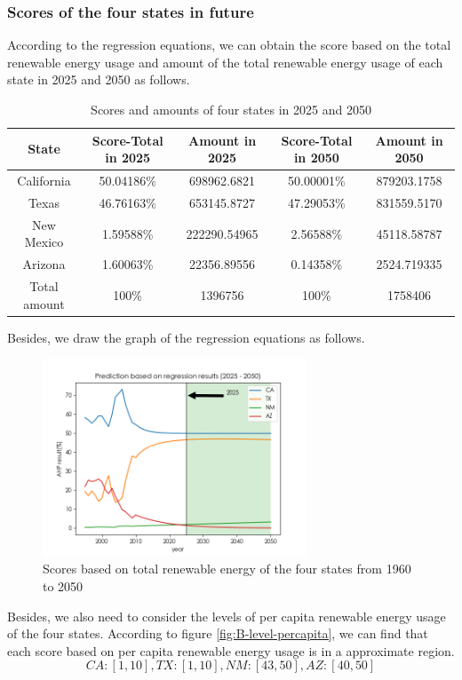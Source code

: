 \documentclass[a4paper,11pt]{article}
\begin{document}
\subsubsection{Scores of the four states in future}
\par According to the regression equations, we can obtain the score based on the total renewable energy usage and amount of the total renewable energy usage of each state in 2025 and 2050 as follows.
\begin{table}[!hbp]
    \centering 
    \begin{tabular}{|c|c|c|c|c|}
\hline
State & Score-Total in 2025 & Amount in 2025 & Score-Total in 2050 & Amount in 2050\\
\hline
California & 50.04186\% & 698962.6821 & 50.00001\% & 879203.1758 \\
\hline
Texas & 46.76163\% & 653145.8727 & 47.29053\% & 831559.5170 \\
\hline
New Mexico & 1.59588\% & 222290.54965 & 2.56588\% & 45118.58787 \\
\hline
Arizona & 1.60063\% & 22356.89556 & 0.14358\% &2524.719335 \\
\hline
Total amount & 100\% & 1396756 & 100\% & 1758406 \\
\hline
\end{tabular}
\caption{Scores and amounts of four states in 2025 and 2050}
\label{tab:Scores and amounts}
\end{table}
\par Besides, we draw the graph of the regression equations as follows.
\begin{figure}[h]%
    \centering 
    \includegraphics[width=0.7\textwidth]{./Pic/D-scores.png}
    \caption{Scores based on total renewable energy of the four states from 1960 to 2050}
    \label{fig:D-scores}  
\end{figure}
\par Besides, we also need to consider the levels of per capita renewable energy usage of the four states. According to figure \ref{fig:B-level-percapita}, we can find that each score based on per capita renewable energy usage is in a approximate region.
\[
CA:[1,10], TX:[1,10], NM:[43,50], AZ:[40,50]
\]
\end{document}
